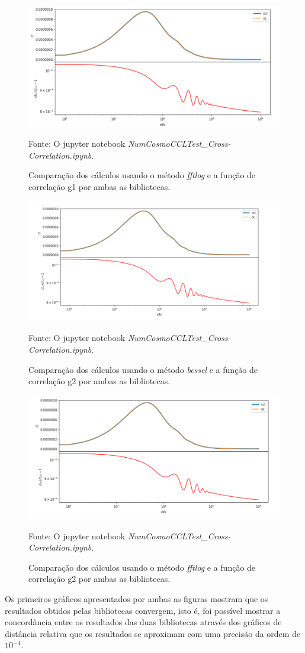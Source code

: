 \begin{figure}[H]
	\centering
	\caption{Comparação dos cálculos usando o método \textit{fftlog} e a função de correlação g1 por ambas as bibliotecas.}
	\includegraphics[width=0.7\linewidth]{"figuras/fig6"}	
	\label{fig:fig6}
	
	Fonte: O jupyter notebook \textit{NumCosmoCCLTest\_Cross-Correlation.ipynb}.
\end{figure}

\begin{figure}[H]
	\centering
	\caption{Comparação dos cálculos usando o método \textit{bessel} e a função de correlação g2 por ambas as bibliotecas.}
	\includegraphics[width=0.7\linewidth]{"figuras/fig7"}	
	\label{fig:fig7}
	
	Fonte: O jupyter notebook \textit{NumCosmoCCLTest\_Cross-Correlation.ipynb}.
\end{figure}

\begin{figure}[H]
	\centering
	\caption{Comparação dos cálculos usando o método \textit{fftlog} e a função de correlação g2 por ambas as bibliotecas.}
	\includegraphics[width=0.7\linewidth]{"figuras/fig8"}	
	\label{fig:fig8}
	
	Fonte: O jupyter notebook \textit{NumCosmoCCLTest\_Cross-Correlation.ipynb}.
\end{figure}

Os primeiros gráficos apresentados por ambas as figuras mostram que os resultados obtidos pelas bibliotecas convergem, isto é, foi possível mostrar a concordância entre os resultados das duas bibliotecas através dos gráficos de distância relativa que os resultados se aproximam com uma precisão da ordem de $ 10^{-4} $. 
